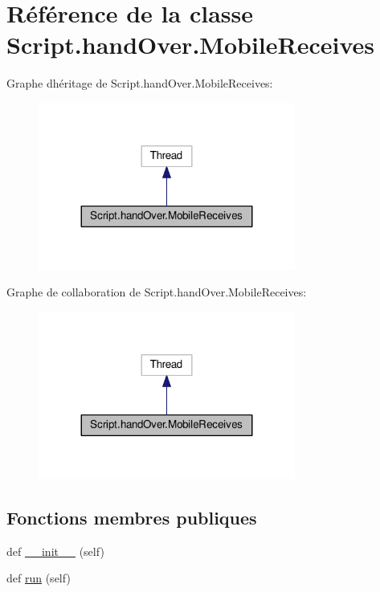\hypertarget{classScript_1_1handOver_1_1MobileReceives}{}\section{Référence de la classe Script.\+hand\+Over.\+Mobile\+Receives}
\label{classScript_1_1handOver_1_1MobileReceives}


Graphe d\textquotesingle{}héritage de Script.\+hand\+Over.\+Mobile\+Receives\+:\nopagebreak
\begin{figure}[H]
\begin{center}
\leavevmode
\includegraphics[width=239pt]{classScript_1_1handOver_1_1MobileReceives__inherit__graph}
\end{center}
\end{figure}


Graphe de collaboration de Script.\+hand\+Over.\+Mobile\+Receives\+:\nopagebreak
\begin{figure}[H]
\begin{center}
\leavevmode
\includegraphics[width=239pt]{classScript_1_1handOver_1_1MobileReceives__coll__graph}
\end{center}
\end{figure}
\subsection*{Fonctions membres publiques}
\begin{DoxyCompactItemize}
\item 
def \hyperlink{classScript_1_1handOver_1_1MobileReceives_abb762c0c475770a14588d7005e1320da}{\+\_\+\+\_\+init\+\_\+\+\_\+} (self)
\item 
def \hyperlink{classScript_1_1handOver_1_1MobileReceives_a340893dfd7b7d84b3282bd0c24044e37}{run} (self)
\end{DoxyCompactItemize}
